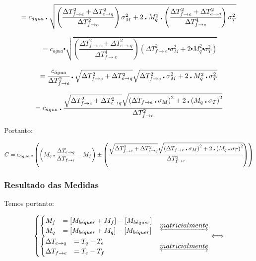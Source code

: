 \documentclass[a4paper]{article}
\begin{document}
			\[
				=c_{\acute{a}gua}\centerdot\sqrt{\left(\dfrac{\Delta T_{f\rightarrow e}^{2}+\Delta T_{e\rightarrow q}^{2}}{\Delta T_{f\rightarrow e}^{2}}\right)\sigma_{M}^{2}+2\centerdot M_{q}^{2}\centerdot\left(\cfrac{\Delta T_{f\rightarrow e}^{2}+\Delta T_{e\rightarrow q}^{2}}{\Delta T_{f\rightarrow e}^{4}}\right)\sigma_{T}^{2}}
			\]


			\[
				=c_{\acute{a}gua}\centerdot\sqrt{\left(\dfrac{\Delta T_{f\rightarrow e}^{2}+\Delta T_{e\rightarrow q}^{2}}{\Delta T_{f\rightarrow e}^{4}}\right)\left(\Delta T_{f\rightarrow e}^{2}\centerdot\sigma_{M}^{2}+2\centerdot M_{q}^{2}\centerdot\sigma_{T}^{2}\right)}
			\]


			\[
				=\cfrac{c_{\acute{a}gua}}{\Delta T_{f\rightarrow e}^{2}}\centerdot\sqrt{\Delta T_{f\rightarrow e}^{2}+\Delta T_{e\rightarrow q}^{2}}\sqrt{\Delta T_{f\rightarrow e}^{2}\centerdot\sigma_{M}^{2}+2\centerdot M_{q}^{2}\centerdot\sigma_{T}^{2}}
			\]


			\[
				=c_{\acute{a}gua}\centerdot\cfrac{\sqrt{\Delta T_{f\rightarrow e}^{2}+\Delta T_{e\rightarrow q}^{2}}\sqrt{\left(\Delta T_{f\rightarrow e}\centerdot\sigma_{M}\right)^{2}+2\centerdot\left(M_{q}\centerdot\sigma_{T}\right)^{2}}}{\Delta T_{f\rightarrow e}^{2}}
			\]


			Portanto:

			\[
			C=c_{\acute{a}gua}\centerdot\left(\left(M_{q}\centerdot\dfrac{\Delta T_{e\rightarrow q}}{\Delta T_{f\rightarrow e}}-M_{f}\right)\pm\left(\cfrac{\sqrt{\Delta T_{f\rightarrow e}^{2}+\Delta T_{e\rightarrow q}^{2}}\sqrt{\left(\Delta T_{f\rightarrow e}\centerdot\sigma_{M}\right)^{2}+2\centerdot\left(M_{q}\centerdot\sigma_{T}\right)^{2}}}{\Delta T_{f\rightarrow e}^{2}}\right)\right)
			\]

		\subsubsection{Resultado das Medidas}

			Temos portanto:

			\[
			\begin{cases}
				\begin{cases}
					M_{f} & =\left[M_{b\acute{e}quer}+M_{f}\right]-\left[M_{b\acute{e}quer}\right]\\
					M_{q} & =\left[M_{b\acute{e}quer}+M_{q}\right]-\left[M_{b\acute{e}quer}\right]
				\end{cases} & \underleftrightarrow{matricialmente}\\
				\begin{cases}
					\Delta T_{e\rightarrow q} & =T_{q}-T_{e}\\
					\Delta T_{f\rightarrow e} & =T_{e}-T_{f}
				\end{cases} & \underleftrightarrow{matricialmente}
			\end{cases}\Longleftrightarrow
			\]
\end{document}
